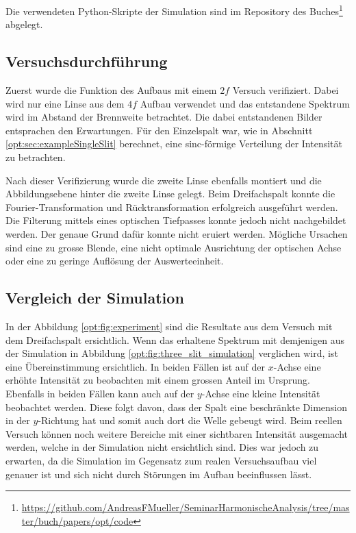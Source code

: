 Die verwendeten Python-Skripte der Simulation sind im Repository des Buches\footnote{\url{https://github.com/AndreasFMueller/SeminarHarmonischeAnalysis/tree/master/buch/papers/opt/code}}
abgelegt.

\subsection{Versuchsdurchführung}
Zuerst wurde die Funktion des Aufbaus mit einem $2f$ Versuch verifiziert.
Dabei wird nur eine Linse aus dem $4f$ Aufbau verwendet und das entstandene Spektrum wird im Abstand der Brennweite betrachtet.
Die dabei entstandenen Bilder entsprachen den Erwartungen.
Für den Einzelspalt war, wie in Abschnitt \ref{opt:sec:exampleSingleSlit} berechnet, eine sinc-förmige Verteilung der Intensität zu betrachten.

Nach dieser Verifizierung wurde die zweite Linse ebenfalls montiert und die Abbildungsebene hinter die zweite Linse gelegt.
Beim Dreifachspalt konnte die Fourier-Transformation und Rücktransformation erfolgreich ausgeführt werden.
Die Filterung mittels eines optischen Tiefpasses konnte jedoch nicht nachgebildet werden.
Der genaue Grund dafür konnte nicht eruiert werden.
Mögliche Ursachen sind eine zu grosse Blende, eine nicht optimale Ausrichtung der optischen Achse oder eine zu geringe Auflösung der Auswerteeinheit.

\subsection{Vergleich der Simulation}
In der Abbildung \ref{opt:fig:experiment} sind die Resultate aus dem Versuch mit dem Dreifachspalt ersichtlich.
Wenn das erhaltene Spektrum mit demjenigen aus der Simulation in Abbildung \ref{opt:fig:three_slit_simulation} verglichen wird, ist eine Übereinstimmung ersichtlich.
In beiden Fällen ist auf der $x$-Achse eine erhöhte Intensität zu beobachten mit einem grossen Anteil im Ursprung.
Ebenfalls in beiden Fällen kann auch auf der $y$-Achse eine kleine Intensität beobachtet werden.
Diese folgt davon, dass der Spalt eine beschränkte Dimension in der $y$-Richtung hat und somit auch dort die Welle gebeugt wird.
Beim reellen Versuch können noch weitere Bereiche mit einer sichtbaren Intensität ausgemacht werden, welche in der Simulation nicht ersichtlich sind.
Dies war jedoch zu erwarten, da die Simulation im Gegensatz zum realen Versuchsaufbau viel genauer ist und sich nicht durch Störungen im Aufbau beeinflussen lässt.


